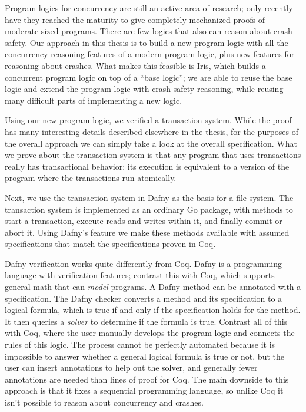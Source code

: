 Program logics for concurrency are still an active area of research; only
recently have they reached the maturity to give completely mechanized proofs of
moderate-sized programs. There are few logics that also can reason about crash
safety. Our approach in this thesis is to build a new program logic with all the
concurrency-reasoning features of a modern program logic, plus new features for
reasoning about crashes. What makes this feasible is Iris, which builds a
concurrent program logic on top of a ``base logic''; we are able to reuse the
base logic and extend the program logic with crash-safety reasoning, while
reusing many difficult parts of implementing a new logic.

Using our new program logic, we verified a transaction system. While the proof
has many interesting details described elsewhere in the thesis, for the purposes
of the overall approach we can simply take a look at the overall specification.
What we prove about the transaction system is that any program that uses
transactions really has transactional behavior: its execution is equivalent to a
version of the program where the transactions run atomically.

Next, we use the transaction system in Dafny as the basis for a file system.
The transaction system is implemented as an ordinary Go package, with methods to
start a transaction, execute reads and writes within it, and finally commit or
abort it. Using Dafny's  feature we make these methods available with
assumed specifications that match the specifications proven in Coq.

Dafny verification works quite differently from Coq. Dafny is a programming
language with verification features; contrast this with Coq, which supports
general math that can \emph{model} programs. A Dafny method can be annotated
with a specification. The Dafny checker converts a method and its specification
to a logical formula, which is true if and only if the specification holds for
the method. It then queries a \emph{solver} to determine if the formula is true.
Contrast all of this with Coq, where the user manually develops the program
logic and connects the rules of this logic. The process cannot be perfectly
automated because it is impossible to answer whether a general logical formula
is true or not, but the user can insert annotations to help out the solver, and
generally fewer annotations are needed than lines of proof for Coq. The main
downside to this approach is that it fixes a sequential programming language, so
unlike Coq it isn't possible to reason about concurrency and crashes.

